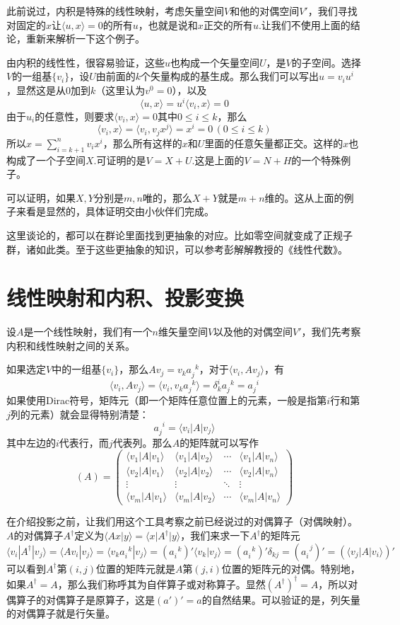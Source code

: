 \documentclass[11pt,a4paper,openany]{book}%
\theoremstyle{plain}%
\begin{document}
此前说过，内积是特殊的线性映射，考虑矢量空间$V$和他的对偶空间$V'$，我们寻找对固定的$x$让$\langle u,x \rangle=0$的所有$u$，也就是说和$x$正交的所有$u$.让我们不使用上面的结论，重新来解析一下这个例子。

由内积的线性性，很容易验证，这些$u$也构成一个矢量空间$U$，是$V$的子空间。选择$V$的一组基$\{v_i\}$，设$U$由前面的$k$个矢量构成的基生成。那么我们可以写出$u=v_iu^i$，显然这是从0加到$k$（这里认为$v^0=0$），以及
\[
\langle u,x \rangle=u^i\langle v_i,x \rangle=0
\]
由于$u_i$的任意性，则要求$\langle v_i,x \rangle=0$其中$0\leq i \leq k$，那么
\[
\langle v_i,x \rangle=\langle v_i,v_j x^j\rangle=x^i=0\,(0\leq i \leq k)
\]
所以$x=\sum_{i=k+1}^n v_ix^i$，那么所有这样的$x$和$U$里面的任意矢量都正交。这样的$x$也构成了一个子空间$X$.可证明的是$V=X+U$.这是上面的$V=N+H$的一个特殊例子。

可以证明，如果$X,Y$分别是$m,n$唯的，那么$X+Y$就是$m+n$维的。这从上面的例子来看是显然的，具体证明交由小伙伴们完成。

这里谈论的，都可以在群论里面找到更抽象的对应。比如零空间就变成了正规子群，诸如此类。至于这些更抽象的知识，可以参考彭解解教授的《线性代数》。
\section{线性映射和内积、投影变换}
设$A$是一个线性映射，我们有一个$n$维矢量空间$V$以及他的对偶空间$V'$，我们先考察内积和线性映射之间的关系。

如果选定$V$中的一组基$\{v_{i}\}$，那么$Av_{j}=v_{k}a_{j}^{\,\,\,k}$，对于$\langle v_i,Av_j \rangle$，有
\[
\langle v_i,Av_j \rangle=\langle v_i,v_{k}a_{j}^{\,\,\,k} \rangle=\delta_{k}^i a_{j}^{\,\,\,k} =a_{j}^{\,\,\,i}
\]
如果使用Dirac符号，矩阵元（即一个矩阵任意位置上的元素，一般是指第$i$行和第$j$列的元素）就会显得特别清楚：
\[
a_{j}^{\,\,\,i}=\langle v_i|A|v_j \rangle
\]
其中左边的$i$代表行，而$j$代表列。那么$A$的矩阵就可以写作
\[
(A)=\begin{pmatrix}
\langle v_1|A|v_1 \rangle& \langle v_1|A|v_2 \rangle & \cdots & \langle v_1|A|v_n \rangle\\
\langle v_2|A|v_1 \rangle& \langle v_2|A|v_2 \rangle & \cdots & \langle v_2|A|v_n \rangle\\
\vdots & \vdots & \ddots & \vdots \\
\langle v_m|A|v_1 \rangle& \langle v_m|A|v_2 \rangle & \cdots & \langle v_m|A|v_n \rangle
\end{pmatrix}
\]

在介绍投影之前，让我们用这个工具考察之前已经说过的对偶算子（对偶映射）。$A$的对偶算子$A^\dag$定义为$\langle Ax|y \rangle=\langle x|A^\dag|y \rangle$，我们来求一下$A^\dag$的矩阵元
\[
\langle v_i|A^\dag|v_j \rangle=\langle Av_i|v_j \rangle=\langle v_ka_i^{\,\,\,k}|v_j \rangle=(a_i^{\,\,\,k})'\langle v_k|v_j \rangle=(a_i^{\,\,\,k})'\delta_{kj}=(a_i^{\,\,\,j})'=(\langle v_j|A|v_i \rangle)'
\]
可以看到$A^\dag$第$(i,j)$位置的矩阵元就是$A$第$(j,i)$位置的矩阵元的对偶。特别地，如果$A^\dag=A$，那么我们称呼其为{\kaishu 自伴算子}或{\kaishu 对称算子}。显然$(A^\dag)^\dag=A$，所以对偶算子的对偶算子是原算子，这是$(a')'=a$的自然结果。可以验证的是，列矢量的对偶算子就是行矢量。
\end{document}
